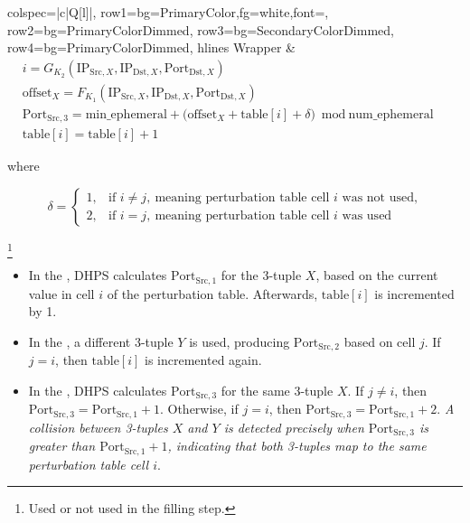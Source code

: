 \documentclass[twocolumn]{report}
\begin{document}
\begin{center}
\begin{adjustbox}{max width=0.95\columnwidth}
\begin{tblr}{
			colspec={|c|Q[l]|},
			row{1}={bg=PrimaryColor,fg=white,font=\bfseries},
			row{2}={bg=PrimaryColorDimmed},
			row{3}={bg=SecondaryColorDimmed},
			row{4}={bg=PrimaryColorDimmed},
			hlines
			}
			Wrapper       &
			\(
			\begin{aligned}
				 & i = G_{K_2}(\text{IP}_{\text{Src},X}, \text{IP}_{\text{Dst},X}, \text{Port}_{\text{Dst},X})                                             \\
				 & \text{offset}_X = F_{K_1}(\text{IP}_{\text{Src},X}, \text{IP}_{\text{Dst},X}, \text{Port}_{\text{Dst},X})                               \\
				 & \text{Port}_{\text{Src},3} = \text{min\_ephemeral} + \bigl(\text{offset}_X + \text{table}[i] + \delta \bigr)\bmod \text{num\_ephemeral} \\
				 & \text{table}[i] = \text{table}[i] + 1
			\end{aligned}
			\)                                   \\
		\end{tblr}
	\end{adjustbox}
\end{center}
where
\vspace{-1cm}
\begin{center}
  \begin{adjustbox}{max width=\columnwidth}
    \begin{minipage}[t]{0.4\textwidth}
\[
	\delta =
	\begin{cases}
    1, & \text{if } i \neq j,\ \text{meaning perturbation table cell } i \text{ was not used,} \\
		2, & \text{if } i = j,\ \text{meaning perturbation table cell } i \text{ was used}
	\end{cases}
\]
    \end{minipage}
  \end{adjustbox}\footnote{Used or not used in the filling step.}
\end{center}
\begin{itemize}
	\item In the , DHPS calculates \(\text{Port}_{\text{Src},1}\) for the 3-tuple \( X \), based on the current value in cell \( i \) of the perturbation table. Afterwards, \(\text{table}[i]\) is incremented by 1.
	\item In the , a different 3-tuple \( Y \) is used, producing \(\text{Port}_{\text{Src},2}\) based on cell \( j \). If \( j = i \), then \(\text{table}[i]\) is incremented again.
	\item In the , DHPS calculates \(\text{Port}_{\text{Src},3}\) for the same 3-tuple \( X \). If \( j \neq i \), then \(\text{Port}_{\text{Src},3} = \text{Port}_{\text{Src},1} + 1\). Otherwise, if \( j = i \), then \(\text{Port}_{\text{Src},3} = \text{Port}_{\text{Src},1} + 2\). \textit{A collision between 3-tuples \( X \) and \( Y \) is detected precisely when \(\text{Port}_{\text{Src},3}\) is greater than \(\text{Port}_{\text{Src},1} + 1\), indicating that both 3-tuples map to the same perturbation table cell \( i \)}.
\end{itemize}
\end{document}
